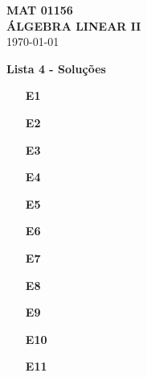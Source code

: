 \documentclass[12pt]{article}
\begin{document}
\begin{center}
    \large \textbf{MAT 01156 \\
    ÁLGEBRA LINEAR II \\}
    \vspace{0.4cm}
    \today
\end{center}

\begin{center}
    \large \textbf{Lista 4 - Soluções}
\end{center}

\begin{enumerate}
    \item [\textbf{E1}]
    \item [\textbf{E2}]
    \item [\textbf{E3}]
    \item [\textbf{E4}]
    \item [\textbf{E5}]
    \item [\textbf{E6}]
    \item [\textbf{E7}]
    \item [\textbf{E8}]
    \item [\textbf{E9}]
    \item [\textbf{E10}]
    \item [\textbf{E11}]
\end{enumerate}
\end{document}
